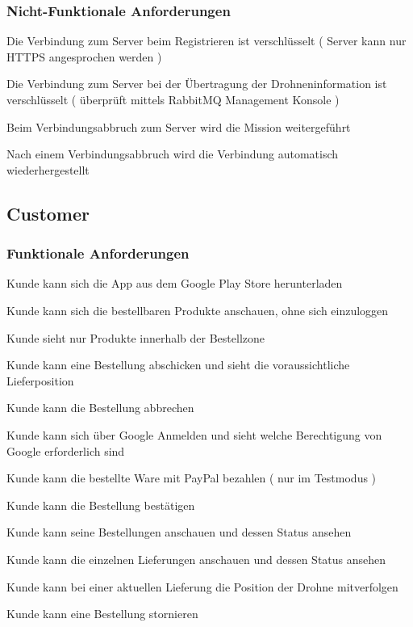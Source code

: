 \subsubsection{Nicht-Funktionale Anforderungen}
\begin{todolist}
	\item Die Verbindung zum Server beim Registrieren ist verschlüsselt ( Server kann nur HTTPS angesprochen werden )
	\item Die Verbindung zum Server bei der Übertragung der Drohneninformation ist verschlüsselt ( überprüft mittels RabbitMQ Management Konsole )
	\item[\done] Beim Verbindungsabbruch zum Server wird die Mission weitergeführt
	\item[\done] Nach einem Verbindungsabbruch wird die Verbindung automatisch wiederhergestellt
\end{todolist}

\subsection{Customer}
\subsubsection{Funktionale Anforderungen}
\begin{todolist}
	\item Kunde kann sich die App aus dem Google Play Store herunterladen 
	\item Kunde kann sich die bestellbaren Produkte anschauen, ohne sich einzuloggen
	\item Kunde sieht nur Produkte innerhalb der Bestellzone
	\item Kunde kann eine Bestellung abschicken und sieht die voraussichtliche Lieferposition
	\item Kunde kann die Bestellung abbrechen
	\item Kunde kann sich über Google Anmelden und sieht welche Berechtigung von Google erforderlich sind
	\item Kunde kann die bestellte Ware mit PayPal bezahlen ( nur im Testmodus )
	\item Kunde kann die Bestellung bestätigen
	\item Kunde kann seine Bestellungen anschauen und dessen Status ansehen
	\item Kunde kann die einzelnen Lieferungen anschauen und dessen Status ansehen
	\item Kunde kann bei einer aktuellen Lieferung die Position der Drohne mitverfolgen
	\item Kunde kann eine Bestellung stornieren
\end{todolist}


